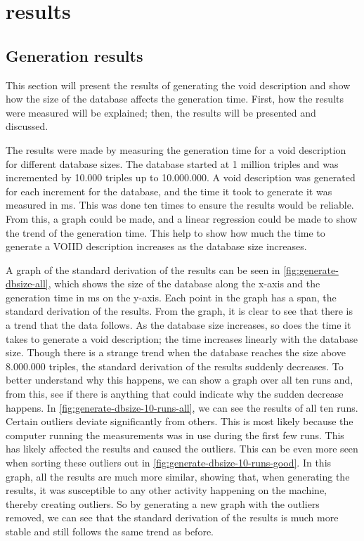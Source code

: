 \section{results}\label{sec:results}
\subsection{Generation results}\label{subsec:generation-results}
This section will present the results of generating the \gls{void} description and show how the size of the database affects the generation time. First, how the results were measured will be explained; then, the results will be presented and discussed.

The results were made by measuring the generation time for a \gls{void} description for different database sizes. The database started at 1 million triples and was incremented by 10.000 triples up to 10.000.000. A \gls{void} description was generated for each increment for the database, and the time it took to generate it was measured in ms. This was done ten times to ensure the results would be reliable. From this, a graph could be made, and a linear regression could be made to show the trend of the generation time. This help to show how much the time to generate a VOIID description increases as the database size increases.

A graph of the standard derivation of the results can be seen in \autoref{fig:generate-dbsize-all}, which shows the size of the database along the x-axis and the generation time in ms on the y-axis. Each point in the graph has a span, the standard derivation of the results. From the graph, it is clear to see that there is a trend that the data follows. As the database size increases, so does the time it takes to generate a \gls{void} description; the time increases linearly with the database size. Though there is a strange trend when the database reaches the size above 8.000.000 triples, the standard derivation of the results suddenly decreases. To better understand why this happens, we can show a graph over all ten runs and, from this, see if there is anything that could indicate why the sudden decrease happens. In \autoref{fig:generate-dbsize-10-runs-all}, we can see the results of all ten runs. Certain outliers deviate significantly from others. This is most likely because the computer running the measurements was in use during the first few runs. This has likely affected the results and caused the outliers. This can be even more seen when sorting these outliers out in \autoref{fig:generate-dbsize-10-runs-good}. In this graph, all the results are much more similar, showing that, when generating the results, it was susceptible to any other activity happening on the machine, thereby creating outliers. So by generating a new graph with the outliers removed, we can see that the standard derivation of the results is much more stable and still follows the same trend as before.

